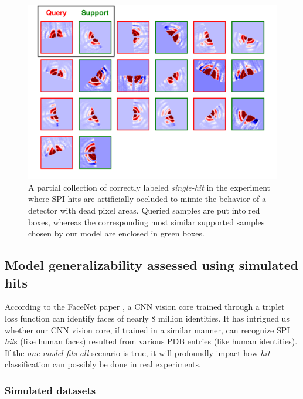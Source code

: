 \begin{figure}
\includegraphics[width=\textwidth,keepaspectratio]
{./figures/true_label.single.real.pdf}

\caption{A partial collection of correctly labeled \textit{single-hit} in the
experiment where SPI hits are artificially occluded to mimic the behavior of a
detector with dead pixel areas.  Queried samples are put into red boxes, whereas
the corresponding most similar supported samples chosen by our model are
enclosed in green boxes.}

\label{fig : true single real}
\end{figure}


\subsection{Model generalizability assessed using simulated hits}

According to the FaceNet paper \cite{schroffFaceNetUnifiedEmbedding2015}, a CNN
vision core trained through a triplet loss function can identify faces of nearly
8 million identities.  It has intrigued us whether our CNN vision core, if
trained in a similar manner, can recognize SPI \textit{hit}s (like human faces)
resulted from various PDB entries (like human identities).  If the
\textit{one-model-fits-all} scenario is true, it will profoundly impact how
\textit{hit} classification can possibly be done in real experiments.  


\subsubsection{Simulated datasets}

